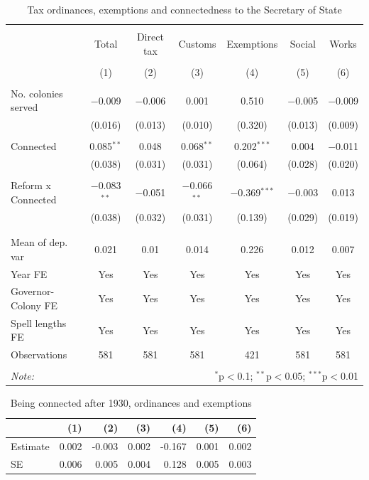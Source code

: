 \documentclass[a4paper]{article}\usepackage[]{graphicx}\usepackage[]{xcolor}
\begin{document}
\begin{table}[!htbp] \centering 
  \caption{Tax ordinances, exemptions and connectedness to the Secretary of State} 
  \label{tab:ord} 
\scriptsize 
\begin{tabular}{@{\extracolsep{5pt}}lcccccc} 
\\[-1.8ex]\hline 
\hline \\[-1.8ex] 
 & Total & Direct tax & Customs & Exemptions & Social & Works \\ 
\\[-1.8ex] & (1) & (2) & (3) & (4) & (5) & (6)\\ 
\hline \\[-1.8ex] 
 No. colonies served & $-$0.009 & $-$0.006 & 0.001 & 0.510 & $-$0.005 & $-$0.009 \\ 
  & (0.016) & (0.013) & (0.010) & (0.320) & (0.013) & (0.009) \\ 
  & & & & & & \\ 
 Connected & 0.085$^{**}$ & 0.048 & 0.068$^{**}$ & 0.202$^{***}$ & 0.004 & $-$0.011 \\ 
  & (0.038) & (0.031) & (0.031) & (0.064) & (0.028) & (0.020) \\ 
  & & & & & & \\ 
 Reform x Connected & $-$0.083$^{**}$ & $-$0.051 & $-$0.066$^{**}$ & $-$0.369$^{***}$ & $-$0.003 & 0.013 \\ 
  & (0.038) & (0.032) & (0.031) & (0.139) & (0.029) & (0.019) \\ 
  & & & & & & \\ 
\hline \\[-1.8ex] 
Mean of dep. var & 0.021 & 0.01 & 0.014 & 0.226 & 0.012 & 0.007 \\ 
Year FE & Yes & Yes & Yes & Yes & Yes & Yes \\ 
Governor-Colony FE & Yes & Yes & Yes & Yes & Yes & Yes \\ 
Spell lengths FE & Yes & Yes & Yes & Yes & Yes & Yes \\ 
Observations & 581 & 581 & 581 & 421 & 581 & 581 \\ 
\hline 
\hline \\[-1.8ex] 
\textit{Note:}  & \multicolumn{6}{r}{$^{*}$p$<$0.1; $^{**}$p$<$0.05; $^{***}$p$<$0.01} \\ 
\end{tabular} 
\end{table} 
\begin{table}[!h]
\centering\centering\centering
\caption{\label{tab:combo_ord}Being connected after 1930, ordinances and exemptions}
\centering
\fontsize{7}{9}\selectfont
\begin{tabular}[t]{lrrrrrr}
\toprule
  & (1) & (2) & (3) & (4) & (5) & (6)\\
\midrule
Estimate & 0.002 & -0.003 & 0.002 & -0.167 & 0.001 & 0.002\\
SE & 0.006 & 0.005 & 0.004 & 0.128 & 0.005 & 0.003\\
\bottomrule
\end{tabular}
\end{table}
\end{document}
